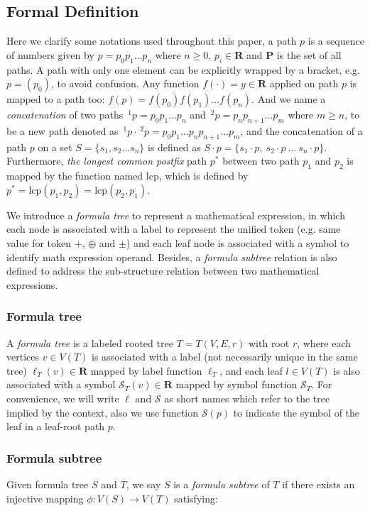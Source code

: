 \documentclass{acm_proc_article-sp}
\begin{document}
\subsection{Formal Definition}
Here we clarify some notations used throughout this paper, a path $p$ is a sequence of numbers given by $p = p_0 p_1 \ldots p_n$ where $n\ge0$, $p_i \in \mathbf{R}$ and $\mathbf{P}$ is the set of all paths.
A path with only one element can be explicitly wrapped by a bracket, e.g. $p=(p_0)$, to avoid confusion.
Any function $f(\cdot) = y \in \mathbf{R}$ applied on path $p$ is mapped to a path too: $f(p)=f(p_0)f(p_1) \ldots f(p_n)$.
And we name  a \textit{concatenation} of two paths $\,^1p = p_0p_1 \ldots p_n$ and $\,^2p = p_np_{n+1} \ldots p_m$ where $m \ge n$, to be a new path denoted as $\,^1p \cdot \,^2p = p_0p_1 \ldots p_n p_{n+1} \ldots p_m$,
and the concatenation of a path $p$ on a set $S = \{ s_1, s_2 \ldots s_n \}$ is defined as $S \cdot p = \{ s_1\cdot p,\  s_2\cdot p \ \ldots \ s_n\cdot p \}$.
Furthermore, \textit{the longest common postfix} path $p^*$ between two path $p_1$ and $p_2$ is mapped by the function named $\mathrm{lcp}$, which is defined by $p^* = \mathrm{lcp}(p_1, p_2) = \mathrm{lcp}(p_2, p_1)$.

We introduce a \textit{formula tree} to represent a mathematical expression, in which each node is associated with a label to represent the unified token (e.g. same value for token $+$, $\oplus$ and $\pm$) and each leaf node is associated with a symbol to identify math expression operand. 
Besides, a \textit{formula subtree} relation is also defined to address the sub-structure relation between two mathematical expressions.

\subsubsection{Formula tree}
A \textit{formula tree} is a labeled rooted tree $T = T(V,E,r)$ with root $r$, where each vertices $v \in V(T)$ is associated with a label (not necessarily unique in the same tree) $\ell_T(v) \in \mathbf{R}$ mapped by label function $\ell_T$,
and each leaf $l \in V(T)$ is also associated with a symbol $\mathcal{S}_T(v) \in \mathbf{R}$ mapped by symbol function $\mathcal{S}_T$. For convenience, we will write $\ell$ and $\mathcal{S}$ as short names which refer to the tree implied by the context, also we use function $\mathcal{S}(p)$ to indicate the symbol of the leaf in a leaf-root path $p$.

\subsubsection{Formula subtree}
\label{frmlsubtreeDef}
Given formula tree $S$ and $T$, we say $S$ is a \textit{formula subtree} of $T$ if there exists an injective mapping $\phi: V(S) \rightarrow V(T)$ satisfying:
\end{document}
